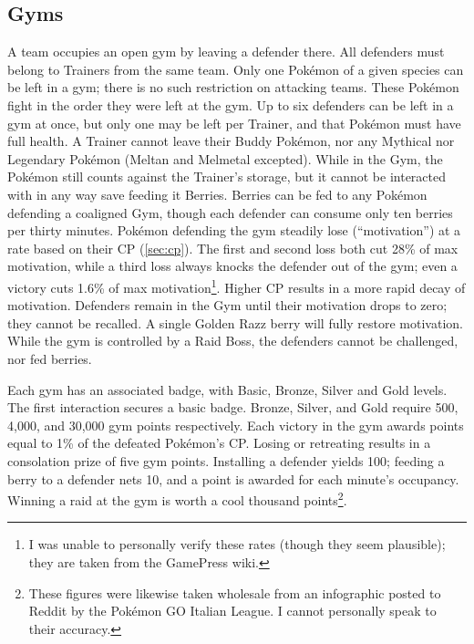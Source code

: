 \subsection{Gyms\label{sec:gyms}}
A team occupies an open gym by leaving a defender there.
All defenders must belong to Trainers from the same team.
Only one Pokémon of a given species can be left in a gym; there is no
  such restriction on attacking teams.
These Pokémon fight in the order they were left at the gym.
Up to six defenders can be left in a gym at once, but only one
  may be left per Trainer, and that Pokémon must have full health.
A Trainer cannot leave their Buddy Pokémon, nor any Mythical nor Legendary
  Pokémon (Meltan and Melmetal excepted).
While in the Gym, the Pokémon still counts against the Trainer's storage,
  but it cannot be interacted with in any way save feeding it Berries.
Berries can be fed to any Pokémon defending a coaligned Gym, though
  each defender can consume only ten berries per thirty minutes.
Pokémon defending the gym steadily lose \HP{} (``motivation'') at a rate
  based on their CP (\autoref{sec:cp}).
The first and second loss both cut 28\% of max motivation, while
  a third loss always knocks the defender out of the gym;
  even a victory cuts 1.6\% of max motivation\footnote{I was unable to personally verify these rates (though they seem plausible); they are taken from the GamePress wiki.}.
Higher CP results in a more rapid decay of motivation.
Defenders remain in the Gym until their motivation drops to zero; they cannot be recalled.
A single Golden Razz berry will fully restore motivation.
While the gym is controlled by a Raid Boss, the defenders cannot be challenged,
  nor fed berries.

Each gym has an associated badge, with Basic, Bronze, Silver and Gold levels.
The first interaction secures a basic badge.
Bronze, Silver, and Gold require 500, 4,000, and 30,000 gym points respectively.
Each victory in the gym awards points equal to 1\% of the defeated Pokémon's CP.
Losing or retreating results in a consolation prize of five gym points.
Installing a defender yields 100; feeding a berry to a defender nets 10,
 and a point is awarded for each minute's occupancy.
Winning a raid at the gym is worth a cool thousand points\footnote{These figures were likewise taken wholesale from an
 infographic posted to Reddit by the Pokémon GO Italian League. I cannot personally speak to their accuracy.}.

